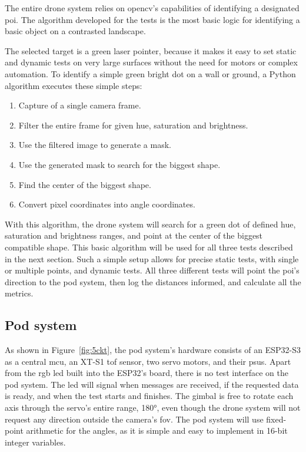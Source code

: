 The entire drone system relies on \gls{opencv}'s capabilities of identifying
a designated \gls{poi}. The algorithm developed for the tests is the most
basic logic for identifying a basic object on a contrasted landscape.

The selected target is a green laser pointer, because it makes it easy to set static
and dynamic tests on very large surfaces without the need for motors or
complex automation. To identify a simple green bright dot on a wall or ground,
a Python algorithm executes these simple steps:

\begin{enumerate}
  \item Capture of a single camera frame.
  \item Filter the entire frame for given hue, saturation and brightness.
  \item Use the filtered image to generate a mask.
  \item Use the generated mask to search for the biggest shape.
  \item Find the center of the biggest shape.
  \item Convert pixel coordinates into angle coordinates.
\end{enumerate}

With this algorithm, the drone system will search for a green dot of defined
hue, saturation and brightness ranges, and point at the center of the biggest
compatible shape. This basic algorithm will be used for all three tests
described in the next section. Such a simple setup allows for precise
static tests, with single or multiple points, and dynamic tests.
All three different tests will point the \gls{poi}'s direction to the pod
system, then log the distances informed, and calculate all the metrics.

\subsection{Pod system}

As shown in Figure~\ref{fig:5ckt}, the pod system's hardware consists of an
ESP32-S3 as a central \gls{mcu}, an XT-S1 \gls{tof} sensor, two servo motors,
and their \gls{psu}s. Apart from the \gls{rgb} \gls{led} built into the ESP32's
board, there is no test interface on the pod system. The \gls{led} will
signal when messages are received, if the requested data is ready, and when
the test starts and finishes. The gimbal is free to rotate each axis through the
servo's entire range, 180°, even though the drone system will not request
any direction outside the camera's \gls{fov}.
The pod system will use fixed-point arithmetic for the angles, as it is simple
and easy to implement in 16-bit integer variables.

